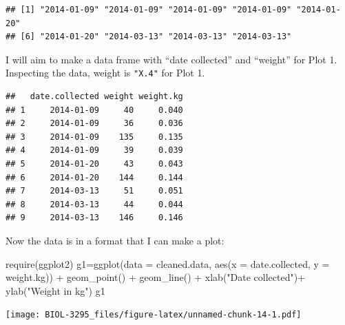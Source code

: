 \documentclass[
]{book}
\newenvironment{Shaded}{\begin{snugshade}}{\end{snugshade}}
\newcommand{\AttributeTok}[1]{\textcolor[rgb]{0.77,0.63,0.00}{#1}}
\newcommand{\CommentTok}[1]{\textcolor[rgb]{0.56,0.35,0.01}{\textit{#1}}}
\newcommand{\DecValTok}[1]{\textcolor[rgb]{0.00,0.00,0.81}{#1}}
\newcommand{\FloatTok}[1]{\textcolor[rgb]{0.00,0.00,0.81}{#1}}
\newcommand{\FunctionTok}[1]{\textcolor[rgb]{0.00,0.00,0.00}{#1}}
\newcommand{\NormalTok}[1]{#1}
\newcommand{\OtherTok}[1]{\textcolor[rgb]{0.56,0.35,0.01}{#1}}
\newcommand{\SpecialCharTok}[1]{\textcolor[rgb]{0.00,0.00,0.00}{#1}}
\newcommand{\StringTok}[1]{\textcolor[rgb]{0.31,0.60,0.02}{#1}}
\begin{document}
\begin{verbatim}
## [1] "2014-01-09" "2014-01-09" "2014-01-09" "2014-01-09" "2014-01-20"
## [6] "2014-01-20" "2014-03-13" "2014-03-13" "2014-03-13"
\end{verbatim}

I will aim to make a data frame with ``date collected'' and ``weight'' for Plot 1. Inspecting the data, weight is \texttt{"X.4"} for Plot 1.

\begin{Shaded}
\end{Shaded}

\begin{verbatim}
##   date.collected weight weight.kg
## 1     2014-01-09     40     0.040
## 2     2014-01-09     36     0.036
## 3     2014-01-09    135     0.135
## 4     2014-01-09     39     0.039
## 5     2014-01-20     43     0.043
## 6     2014-01-20    144     0.144
## 7     2014-03-13     51     0.051
## 8     2014-03-13     44     0.044
## 9     2014-03-13    146     0.146
\end{verbatim}

Now the data is in a format that I can make a plot:

\begin{Shaded}
\begin{Highlighting}[]
\FunctionTok{require}\NormalTok{(ggplot2)}
\NormalTok{g1}\OtherTok{=}\FunctionTok{ggplot}\NormalTok{(}\AttributeTok{data =}\NormalTok{ cleaned.data, }\FunctionTok{aes}\NormalTok{(}\AttributeTok{x =}\NormalTok{ date.collected, }\AttributeTok{y =}\NormalTok{ weight.kg)) }\SpecialCharTok{+} 
  \FunctionTok{geom\_point}\NormalTok{() }\SpecialCharTok{+}
  \FunctionTok{geom\_line}\NormalTok{() }\SpecialCharTok{+}
  \FunctionTok{xlab}\NormalTok{(}\StringTok{"Date collected"}\NormalTok{)}\SpecialCharTok{+}
  \FunctionTok{ylab}\NormalTok{(}\StringTok{"Weight in kg"}\NormalTok{)}
\NormalTok{g1}
\end{Highlighting}
\end{Shaded}

\texttt{[image: BIOL-3295\_files/figure-latex/unnamed-chunk-14-1.pdf]}
\end{document}
